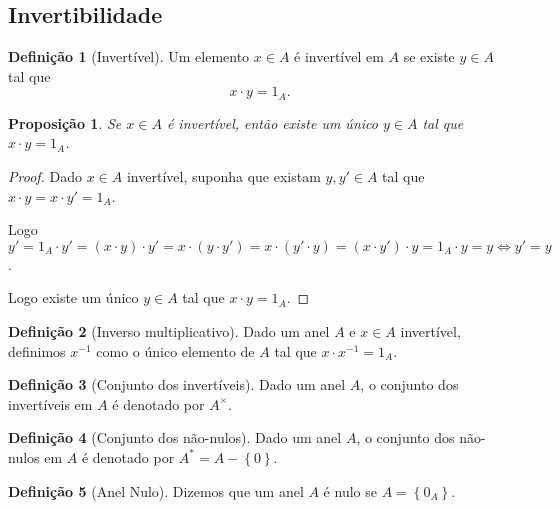 \documentclass{article}
\theoremstyle{plain}
\newtheorem{prop}{Proposição}[section]
\theoremstyle{definition}
\newtheorem{definicao}{Definição}[section]
\theoremstyle{remark}
\begin{document}
\subsection{Invertibilidade}
\begin{definicao}[Invertível]
	Um elemento $x\in A$ é invertível em $A$ se existe $y\in A$ tal que $$x \cdot y = 1_A.$$
\end{definicao}
\begin{prop}
	Se $x\in A$ é invertível, então existe um único $y\in A$ tal que $x\cdot y = 1_A$.
\end{prop}
\begin{proof}
	Dado $x\in A$ invertível, suponha que existam $y,y' \in A$ tal que $x\cdot y = x\cdot y' = 1_A$.

	Logo $y' = 1_A \cdot y' = (x\cdot y) \cdot y' =  x\cdot (y\cdot y') = x\cdot (y'\cdot y) = (x \cdot y')\cdot y = 1_A \cdot y =y \iff y' = y$.

	Logo existe um único $y\in A$ tal que $x\cdot y = 1_A$.
\end{proof}
\begin{definicao}[Inverso multiplicativo]
	Dado um anel $A$ e $x\in A$ invertível, definimos $x^{-1}$ como o único elemento de $A$ tal que $x\cdot x^{-1} = 1_A$.
\end{definicao}

\begin{definicao}[Conjunto dos invertíveis]
	Dado um anel $A$, o conjunto dos invertíveis em $A$ é denotado por $A^{\times}$.
\end{definicao}
\begin{definicao}[Conjunto dos não-nulos]
	Dado um anel $A$, o conjunto dos não-nulos em $A$ é denotado por $A^{*} = A - \left\{0\right\}$.
\end{definicao}
\begin{definicao}[Anel Nulo]
	Dizemos que um anel $A$ é nulo se $A = \left\{ 0_A \right\}$.
\end{definicao}
\end{document}
